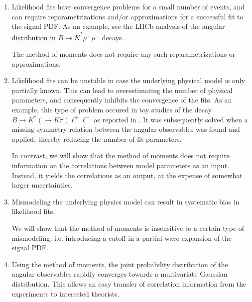 \documentclass[aps,nofootinbib,preprintnumbers,prd,twocolumn]{revtex4-1}
\begin{document}
\begin{enumerate}
    \item Likelihood fits have convergence problems for a small number of
        events, and can require reparametrizations and/or approximations for a
        successful fit to the signal PDF. As an example, see the LHCb
        analysis of the angular distribution in $\bar{B}\to
        \bar{K}^*\mu^+\mu^-$ decays \cite{Aaij:2013qta}.

        The method of
        moments does not require any such reparametrizations or approximations.

    \item Likelihood fits  can be unstable in case the underlying
        physical model is only partially known. This can lead to
        overestimating the number of physical parameters, and consequently
        inhibits the convergence of the fits. As an example, this type
        of problem occured in toy studies of the decay $B\to K^*(\to K\pi)\ell^+\ell^-$
        as reported in \cite{Egede:1142152}. It was subsequently solved
        when a missing symmetry relation between the angular observables
        was found and applied, thereby reducing the number of fit parameters.

        In contrast, we will show that the method of moments does not require
        information on the correlations between model parameters as an input.
        Instead, it yields the correlations as an output, at the expense of
        somewhat larger uncertainties.

    \item Mismodeling the underlying physics model can result in systematic bias
        in likelihood fits.

        We will
        show that the method of moments is insensitive to a certain type of mismodeling;
        i.e. introducing a cutoff in a partial-wave expansion of the signal PDF.

    \item Using the method of moments, the joint probability distribution of the
        angular observables rapidly converges towards a multivariate Gaussian distribution.
        This allows an easy transfer of correlation information from the experiments to
        interested theorists.
\end{enumerate}
\end{document}

